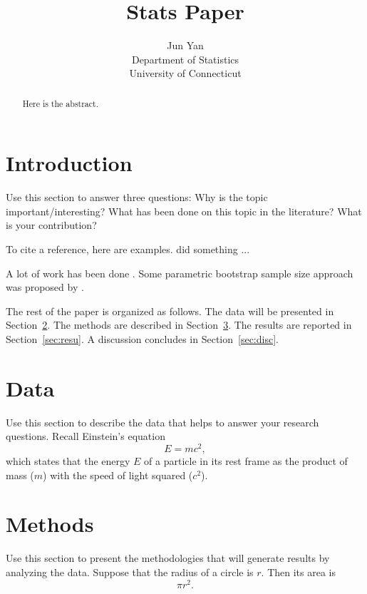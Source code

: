 \documentclass[12pt]{article}
\title{Stats Paper}
\author{Jun Yan\\
  Department of Statistics\\
  University of Connecticut
}
\begin{document}
\maketitle

\begin{abstract}
Here is the abstract.  
\end{abstract}


\section{Introduction}
\label{sec:intro}

Use this section to answer three questions:
Why is the topic important/interesting?
What has been done on this topic in the literature?
What is your contribution?

\lipsum[1-3]

To cite a reference, here are examples.
\citet{bayraci2019deep} did something ... \lipsum[1]

A lot of work has been done \citep[e.g.,][]{xie2015dynamic}.
\lipsum[2]
Some parametric bootstrap sample size approach was proposed by
\citet{lai2020loan}. 


The rest of the paper is organized as follows.
The data will be presented in Section~\ref{sec:data}.
The methods are described in Section~\ref{sec:meth}.
The results are reported in Section~\ref{sec:resu}.
A discussion concludes in Section~\ref{sec:disc}.


\section{Data}
\label{sec:data}

Use this section to describe the data that helps to answer your research
questions. Recall Einstein's equation
\begin{equation}
  \label{eq:mc2}
  E = m c^2,
\end{equation}
which states that the energy $E$ of a particle in its rest frame as the product
of mass ($m$) with the speed of light squared ($c^2$).

\section{Methods}
\label{sec:meth}

Use this section to present the methodologies that will generate results by
analyzing the data. Suppose that the radius of a circle is $r$. Then its area is
\begin{equation}
  \label{eq:area}
  \pi r^2.
\end{equation}
\end{document}
